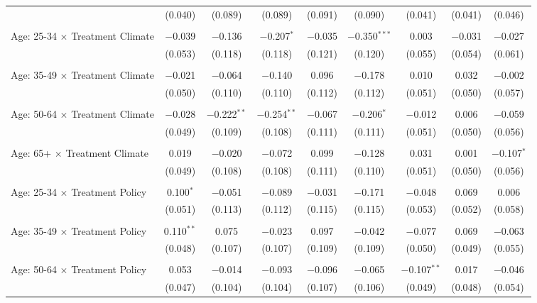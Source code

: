 \begin{tabular}{@{\extracolsep{5pt}}lcccccccc}
  & (0.040) & (0.089) & (0.089) & (0.091) & (0.090) & (0.041) & (0.041) & (0.046) \\ 
  & & & & & & & & \\ 
 Age: 25-34 $\times$ Treatment Climate & $-$0.039 & $-$0.136 & $-$0.207$^{*}$ & $-$0.035 & $-$0.350$^{***}$ & 0.003 & $-$0.031 & $-$0.027 \\ 
  & (0.053) & (0.118) & (0.118) & (0.121) & (0.120) & (0.055) & (0.054) & (0.061) \\ 
  & & & & & & & & \\ 
 Age: 35-49 $\times$ Treatment Climate & $-$0.021 & $-$0.064 & $-$0.140 & 0.096 & $-$0.178 & 0.010 & 0.032 & $-$0.002 \\ 
  & (0.050) & (0.110) & (0.110) & (0.112) & (0.112) & (0.051) & (0.050) & (0.057) \\ 
  & & & & & & & & \\ 
 Age: 50-64 $\times$ Treatment Climate & $-$0.028 & $-$0.222$^{**}$ & $-$0.254$^{**}$ & $-$0.067 & $-$0.206$^{*}$ & $-$0.012 & 0.006 & $-$0.059 \\ 
  & (0.049) & (0.109) & (0.108) & (0.111) & (0.111) & (0.051) & (0.050) & (0.056) \\ 
  & & & & & & & & \\ 
 Age: 65+ $\times$ Treatment Climate & 0.019 & $-$0.020 & $-$0.072 & 0.099 & $-$0.128 & 0.031 & 0.001 & $-$0.107$^{*}$ \\ 
  & (0.049) & (0.108) & (0.108) & (0.111) & (0.110) & (0.051) & (0.050) & (0.056) \\ 
  & & & & & & & & \\ 
 Age: 25-34 $\times$ Treatment Policy & 0.100$^{*}$ & $-$0.051 & $-$0.089 & $-$0.031 & $-$0.171 & $-$0.048 & 0.069 & 0.006 \\ 
  & (0.051) & (0.113) & (0.112) & (0.115) & (0.115) & (0.053) & (0.052) & (0.058) \\ 
  & & & & & & & & \\ 
 Age: 35-49 $\times$ Treatment Policy & 0.110$^{**}$ & 0.075 & $-$0.023 & 0.097 & $-$0.042 & $-$0.077 & 0.069 & $-$0.063 \\ 
  & (0.048) & (0.107) & (0.107) & (0.109) & (0.109) & (0.050) & (0.049) & (0.055) \\ 
  & & & & & & & & \\ 
 Age: 50-64 $\times$ Treatment Policy & 0.053 & $-$0.014 & $-$0.093 & $-$0.096 & $-$0.065 & $-$0.107$^{**}$ & 0.017 & $-$0.046 \\ 
  & (0.047) & (0.104) & (0.104) & (0.107) & (0.106) & (0.049) & (0.048) & (0.054) \\ 

\end{tabular}
